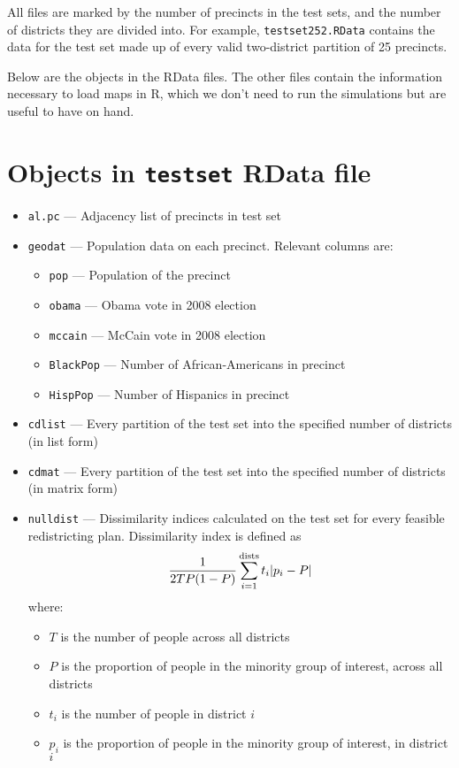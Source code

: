 \documentclass[12pt]{article}
\begin{document}
All files are marked by the number of precincts in the test sets, and the number of districts they are divided into. For example, {\tt testset252.RData} contains the data for the test set made up of every valid two-district partition of 25 precincts. 

Below are the objects in the RData files. The other files contain the information necessary to load maps in R, which we don't need to run the simulations but are useful to have on hand. 
\section{Objects in {\tt testset} RData file}

\begin{itemize}
\item {\tt al.pc} --- Adjacency list of precincts in test set
\item {\tt geodat} --- Population data on each precinct. Relevant columns are:
	\begin{itemize}
	\item {\tt pop} --- Population of the precinct
	\item {\tt obama} --- Obama vote in 2008 election
	\item {\tt mccain} --- McCain vote in 2008 election
	\item {\tt BlackPop} --- Number of African-Americans in precinct
	\item {\tt HispPop} --- Number of Hispanics in precinct
	\end{itemize}
\item {\tt cdlist} --- Every partition of the test set into the specified number of districts (in list form)
\item {\tt cdmat} --- Every partition of the test set into the specified number of districts (in matrix form)
\item {\tt nulldist} --- Dissimilarity indices calculated on the test set for every feasible redistricting plan. Dissimilarity index is defined as $$\frac{1}{2TP(1 - P)}\sum_{i = 1}^{{\rm dists}}t_i|p_i - P|$$
where:
	\begin{itemize}
	\item $T$ is the number of people across all districts
	\item $P$ is the proportion of people in the minority group of interest, across all districts
	\item $t_i$ is the number of people in district $i$
	\item $p_i$ is the proportion of people in the minority group of interest, in district $i$

\end{itemize}
\end{itemize}
\end{document}
